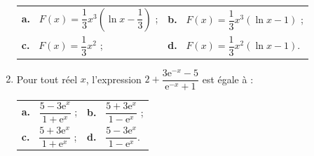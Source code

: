 \documentclass[10pt]{article}
\begin{document}
\begin{enumerate}
\begin{center}
\begin{tabularx}{\linewidth}{*{2}{X}}
\textbf{a.~} $F(x) = \dfrac13 x^3 \left(\ln x - \dfrac13 \right)$ ;&\textbf{b.~} $F(x) = \dfrac13 x^3 (\ln x - 1)$ ;\\[8pt]
\textbf{c.~} $F(x) = \dfrac13 x^2$ ;&\textbf{d.~} $F(x) = \dfrac13 x^2 (\ln x - 1)$.\\
\end{tabularx}
\end{center}

\item Pour tout réel $x$, l'expression $2 + \dfrac{3\text{e}^{-x} - 5}{\text{e}^{-x} + 1}$ est égale à : 

\begin{center}
\begin{tabularx}{\linewidth}{*{2}{X}}
\textbf{a.~} $\dfrac{5 - 3\text{e}^x}{1 + \text{e}^x}$ ;&\textbf{b.~} $\dfrac{5 + 3\text{e}^x}{1 - \text{e}^x}$ ;\\[8pt]
\textbf{c.~} $\dfrac{5 + 3\text{e}^x}{1 + \text{e}^x}$ ;&\textbf{d.~} $\dfrac{5 - 3\text{e}^x}{1 - \text{e}^x}$.
\end{tabularx}
\end{center}
\end{enumerate}

\bigskip
\end{document}
